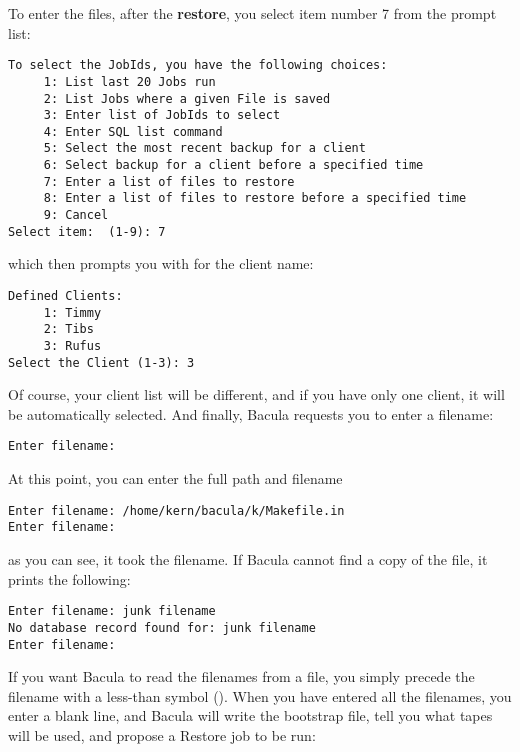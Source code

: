 To enter the files, after the {\bf restore}, you select item number 7 from the
prompt list: 

\footnotesize
\begin{verbatim}
To select the JobIds, you have the following choices:
     1: List last 20 Jobs run
     2: List Jobs where a given File is saved
     3: Enter list of JobIds to select
     4: Enter SQL list command
     5: Select the most recent backup for a client
     6: Select backup for a client before a specified time
     7: Enter a list of files to restore
     8: Enter a list of files to restore before a specified time
     9: Cancel
Select item:  (1-9): 7
\end{verbatim}
\normalsize

which then prompts you with for the client name: 

\footnotesize
\begin{verbatim}
Defined Clients:
     1: Timmy
     2: Tibs
     3: Rufus
Select the Client (1-3): 3
\end{verbatim}
\normalsize

Of course, your client list will be different, and if you have only one
client, it will be automatically selected. And finally, Bacula requests you to
enter a filename: 

\footnotesize
\begin{verbatim}
Enter filename:
\end{verbatim}
\normalsize

At this point, you can enter the full path and filename 

\footnotesize
\begin{verbatim}
Enter filename: /home/kern/bacula/k/Makefile.in
Enter filename:
\end{verbatim}
\normalsize

as you can see, it took the filename. If Bacula cannot find a copy of the
file, it prints the following: 

\footnotesize
\begin{verbatim}
Enter filename: junk filename
No database record found for: junk filename
Enter filename:
\end{verbatim}
\normalsize

If you want Bacula to read the filenames from a file, you simply precede the
filename with a less-than symbol (\lt{}). When you have entered all the
filenames, you enter a blank line, and Bacula will write the bootstrap file,
tell you what tapes will be used, and propose a Restore job to be run: 

